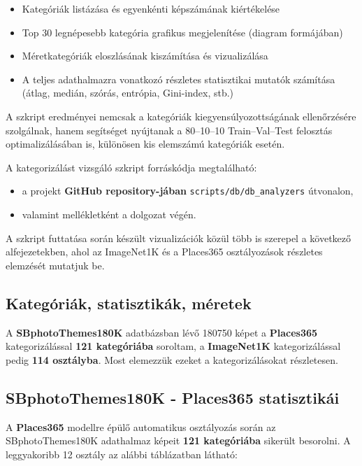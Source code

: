             \begin{itemize}
                \item Kategóriák listázása és egyenkénti képszámának kiértékelése
                \item Top 30 legnépesebb kategória grafikus megjelenítése (diagram formájában)
                \item Méretkategóriák eloszlásának kiszámítása és vizualizálása
                \item A teljes adathalmazra vonatkozó részletes statisztikai mutatók számítása (átlag, medián, szórás, entrópia, Gini-index, stb.)
            \end{itemize}
            
            A szkript eredményei nemcsak a kategóriák kiegyensúlyozottságának ellenőrzésére szolgálnak, hanem segítséget nyújtanak a 80–10–10 Train–Val–Test felosztás optimalizálásában is, különösen kis elemszámú kategóriák esetén.
            
            A kategorizálást vizsgáló szkript forráskódja megtalálható:
            \begin{itemize}
                \item a projekt \textbf{GitHub repository-jában} \texttt{scripts/db/db\_analyzers} útvonalon,
                \item valamint mellékletként a dolgozat végén.
            \end{itemize}
            
            A szkript futtatása során készült vizualizációk közül több is szerepel a következő alfejezetekben, ahol az ImageNet1K és a Places365 osztályozások részletes elemzését mutatjuk be.
    
    \subsection{Kategóriák, statisztikák, méretek}
        A \textbf{SBphotoThemes180K} adatbázsban lévő 180750 képet a \textbf{Places365} kategorizálással \textbf{121 kategóriába} soroltam, a \textbf{ImageNet1K} kategorizálással pedig \textbf{114 osztályba}. Most elemezzük ezeket a kategorizálásokat részletesen.

    \subsection{SBphotoThemes180K - Places365 statisztikái}

        A \textbf{Places365} modellre épülő automatikus osztályozás során az SBphotoThemes180K adathalmaz képeit \textbf{121 kategóriába} sikerült besorolni. A leggyakoribb 12 osztály az alábbi táblázatban látható:

